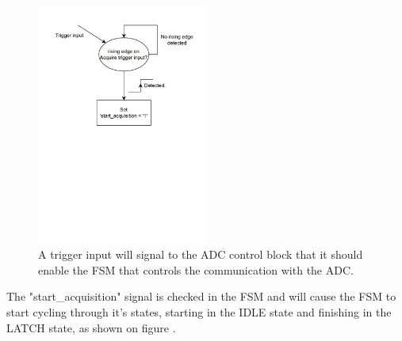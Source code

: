 \begin{figure}[H]
    \centering
    \includegraphics[clip, trim=0 300 0 0, width=0.5\textwidth]{Sections/7_SystemDesign/Figures/7_2_8_StartAcquisition.pdf}
    \caption{A trigger input will signal to the ADC control block that it should enable the FSM that controls the communication with the ADC.}
    \label{fig:7_2_8_ADC_START_ACQ}
\end{figure}

The "start\_acquisition" signal is checked in the FSM and will cause the FSM to start cycling through it's states, starting in the IDLE state and finishing in the LATCH state, as shown on figure .


